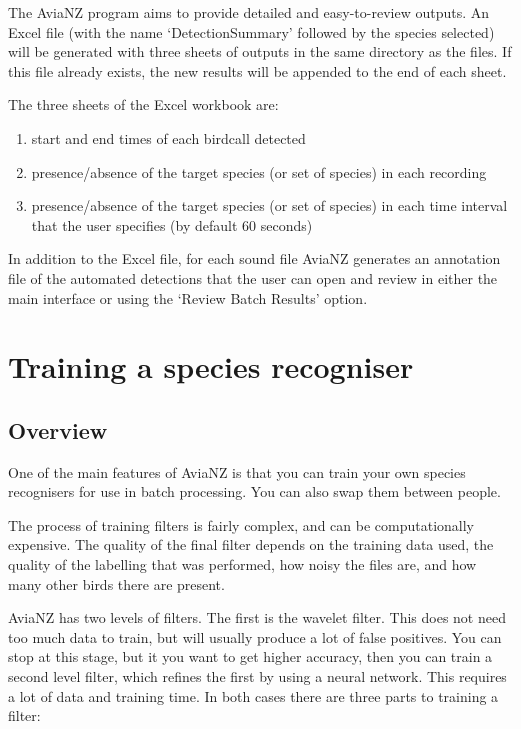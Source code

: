 \documentclass{article}
\begin{document}
The AviaNZ program aims to provide detailed and easy-to-review outputs. An Excel file (with the name `DetectionSummary' followed by the species selected) will be generated with three sheets of outputs in the same directory as the files. If this file already exists, the new results will be appended to the end of each sheet. 

The three sheets of the Excel workbook are:
\begin{enumerate}
\item start and end times of each birdcall detected
\item presence/absence of the target species (or set of species) in each recording
\item  presence/absence of the target species (or set of species) in each time interval that the user specifies (by default 60 seconds)
\end{enumerate}

In addition to the Excel file, for each sound file AviaNZ generates an annotation file of the automated detections that  the user can open and review in either the main interface or using the `Review Batch Results' option. 

\newpage
\section{Training a species recogniser}\label{sec:trainfilter}

\subsection{Overview}

One of the main features of AviaNZ is that you can train your own species recognisers for use in batch processing. You can also swap them between people.%

The process of training filters is fairly complex, and can be computationally expensive. The quality of the final filter depends on the training data used, the quality of the labelling that was performed, how noisy the files are, and how many other birds there are present.

AviaNZ has two levels of filters. The first is the wavelet filter. This does not need too much data to train, but will usually produce a lot of false positives. You can stop at this stage, but it you want to get higher accuracy, then you can train a second level filter, which refines the first by using a neural network. This requires a lot of data and training time. In both cases there are three parts to training a filter:
\end{document}
